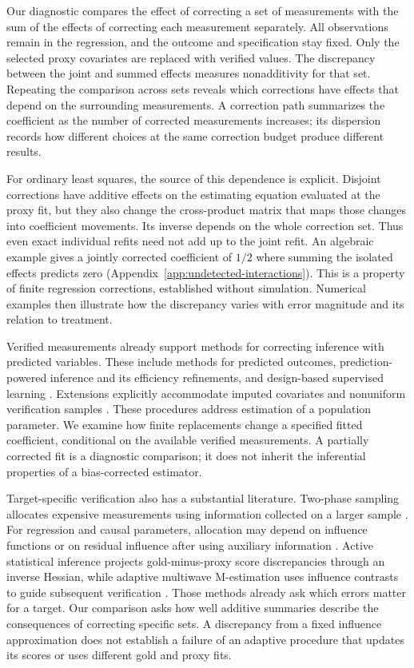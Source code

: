 \documentclass[11pt]{article}
\begin{document}
Our diagnostic compares the effect of correcting a set of measurements with
the sum of the effects of correcting each measurement separately. All
observations remain in the regression, and the outcome and specification stay
fixed. Only the selected proxy covariates are replaced with verified values.
The discrepancy between the joint and summed effects measures nonadditivity
for that set. Repeating the comparison across sets reveals which corrections
have effects that depend on the surrounding measurements. A correction path
summarizes the coefficient as the number of corrected measurements increases;
its dispersion records how different choices at the same correction budget
produce different results.

For ordinary least squares, the source of this dependence is explicit.
Disjoint corrections have additive effects on the estimating equation evaluated
at the proxy fit, but they also change the cross-product matrix that maps those
changes into coefficient movements. Its inverse depends on the whole correction
set. Thus even exact individual refits need not add up to the joint refit.
An algebraic example gives a jointly corrected coefficient of $1/2$ where
summing the isolated effects predicts zero
(Appendix~\ref{app:undetected-interactions}). This is a property of finite
regression corrections, established without simulation. Numerical examples then
illustrate how the discrepancy varies with error magnitude and its relation to
treatment.

Verified measurements already support methods for correcting inference with
predicted variables. These include methods for predicted outcomes,
prediction-powered inference and its efficiency refinements, and design-based
supervised learning \citep{wang2020,angelopoulos2023,angelopoulos2023ppi,egami2023}.
Extensions explicitly accommodate imputed covariates and nonuniform verification
samples \citep{kluger2025}. These procedures address estimation of a population
parameter. We examine how finite replacements change a specified fitted
coefficient, conditional on the available verified measurements. A partially
corrected fit is a diagnostic comparison; it does not inherit the inferential
properties of a bias-corrected estimator.

Target-specific verification also has a substantial literature. Two-phase
sampling allocates expensive measurements using information collected on a
larger sample \citep{neyman1938,amorim2021}. For regression and causal parameters,
allocation may depend on influence functions or on residual influence after
using auxiliary information \citep{chenlumley2022,wang2023design}. Active
statistical inference projects gold-minus-proxy score discrepancies through an
inverse Hessian, while adaptive multiwave M-estimation uses influence
contrasts to guide subsequent verification \citep{zrnic2024,kluger2026}.
Those methods already ask which errors matter for a target. Our comparison
asks how well additive summaries describe the consequences of correcting
specific sets. A discrepancy from a fixed influence approximation does not
establish a failure of an adaptive procedure that updates its scores or uses
different gold and proxy fits.
\end{document}
